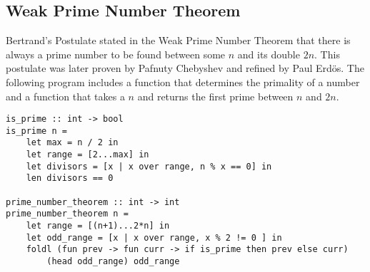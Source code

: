 \documentclass[5pt]{article}
\begin{document}
\subsection{Weak Prime Number Theorem}
Bertrand's Postulate stated in the Weak Prime Number Theorem that there is 
always a prime number to be found between some $n$ and its double $2n$. This 
postulate was later proven by Pafnuty Chebyshev and refined by Paul Erd\"{o}s. 
The following program includes a function that determines the primality of a 
number and a function that takes a $n$ and returns the first prime between 
$n$ and $2n$.
\begin{lstlisting}[language=rippl]
is_prime :: int -> bool
is_prime n =
    let max = n / 2 in
    let range = [2...max] in
    let divisors = [x | x over range, n % x == 0] in
    len divisors == 0
    
prime_number_theorem :: int -> int
prime_number_theorem n =
    let range = [(n+1)...2*n] in
    let odd_range = [x | x over range, x % 2 != 0 ] in
    foldl (fun prev -> fun curr -> if is_prime then prev else curr)
        (head odd_range) odd_range
\end{lstlisting}
\end{document}
